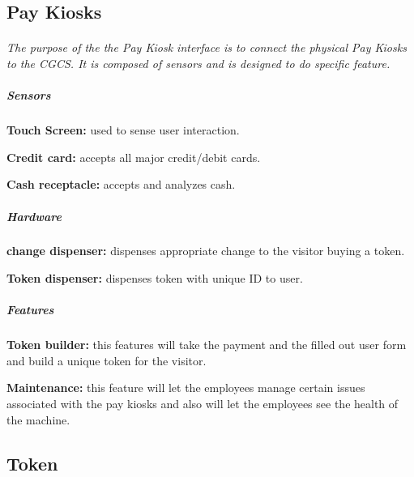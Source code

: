 \documentclass[12pt]{article}
\begin{document}
\subsection{Pay Kiosks}
	\paragraph{} \textit{The purpose of the the Pay Kiosk interface is to connect the physical Pay Kiosks to the CGCS. It is composed of sensors and is designed to do specific feature.}
		\subparagraph{Sensors}
			\begin{list}{}{}
					\item \textbf{Touch Screen: }used to sense user interaction. 
					\item \textbf{Credit card: }accepts all major credit/debit cards. 
					\item \textbf{Cash receptacle: }accepts and analyzes cash. 
			\end{list}
		\subparagraph{Hardware}
			\begin{list}{}{}
					\item \textbf{change dispenser: }dispenses appropriate change to the visitor buying a token.
					\item \textbf{Token dispenser: }dispenses token with unique ID to user.
			\end{list}
		\subparagraph{Features}
			\begin{list}{}{}
					\item \textbf{Token builder: }this features will take the payment and the filled out user form and build a unique token for the visitor.
					\item \textbf{Maintenance: }this feature will let the employees manage certain issues associated with the pay kiosks and also will let the employees see the health of the machine. 
			\end{list}

\subsection{Token}
\end{document}
